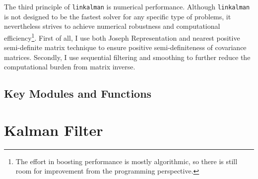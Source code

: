 \documentclass[10pt, titlepage]{article}
\numberwithin{equation}{section}
\begin{document}
The third principle of \texttt{linkalman} is numerical performance. Although \texttt{linkalman} is not designed to be the fastest solver for any specific type of problems, it nevertheless strives to achieve numerical robustness and computational efficiency\footnote{The effort in boosting performance is mostly algorithmic, so there is still room for improvement from the programming perspective.}. First of all, I use both Joseph Representation and nearest positive semi-definite matrix technique to ensure positive semi-definiteness of covariance matrices. Secondly, I use sequential filtering and smoothing to further reduce the computational burden from matrix inverse.  

\subsection{Key Modules and Functions}




















\section{Kalman Filter} \label{sec:filter}
\end{document}
